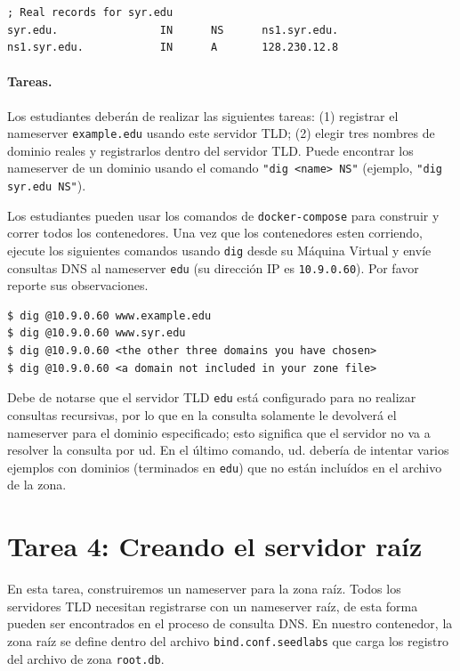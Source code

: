 \begin{lstlisting}
; Real records for syr.edu
syr.edu.                IN      NS      ns1.syr.edu.
ns1.syr.edu.            IN      A       128.230.12.8
\end{lstlisting}
 

\paragraph{Tareas.}
Los estudiantes deberán de realizar las siguientes tareas: (1) registrar el nameserver \texttt{example.edu} usando este servidor TLD; (2) elegir tres nombres de dominio reales y registrarlos dentro del servidor TLD. Puede encontrar los nameserver de un dominio usando el comando \texttt{"dig <name> NS"} (ejemplo, \texttt{"dig syr.edu NS"}).

Los estudiantes pueden usar los comandos de \texttt{docker-compose} para construir y correr todos los contenedores.
Una vez que los contenedores esten corriendo, ejecute los siguientes comandos usando \texttt{dig} desde su Máquina Virtual y envíe consultas DNS al nameserver \texttt{edu} (su dirección IP es \texttt{10.9.0.60}).
Por favor reporte sus observaciones.


\begin{lstlisting}
$ dig @10.9.0.60 www.example.edu
$ dig @10.9.0.60 www.syr.edu
$ dig @10.9.0.60 <the other three domains you have chosen>
$ dig @10.9.0.60 <a domain not included in your zone file>
\end{lstlisting}

Debe de notarse que el servidor TLD \texttt{edu} está configurado para no realizar consultas recursivas, por lo que en la consulta solamente le devolverá el nameserver para el dominio especificado; esto significa que el servidor no va a resolver la consulta por ud. 
En el último comando, ud. debería de intentar varios ejemplos con dominios (terminados en \texttt{edu}) que no están incluídos en el archivo de la zona.


\section{Tarea 4: Creando el servidor raíz}

En esta tarea, construiremos un nameserver para la zona raíz. Todos los servidores TLD necesitan registrarse con un nameserver raíz, de esta forma pueden ser encontrados en el proceso de consulta DNS.
En nuestro contenedor, la zona raíz se define dentro del archivo \texttt{bind.conf.seedlabs} que carga los registro del archivo de zona \texttt{root.db}. 

